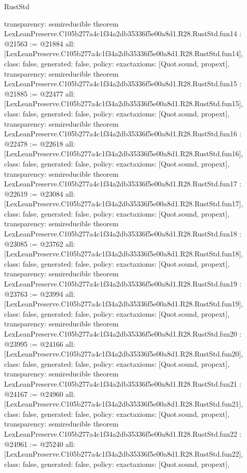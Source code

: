 \begin{lexlean}{RustStd}
\begin{coremodule}
{  transparency: semireducible
}
theorem LexLeanPreserve.C105b277a4c1f34a2db35336f5e00a8d1.R28.RustStd.fun14 : @21563 := @21884 {
  all: [LexLeanPreserve.C105b277a4c1f34a2db35336f5e00a8d1.R28.RustStd.fun14],
  class: false,
  generated: false,
  policy: exact{axioms: [Quot.sound, propext]},
  transparency: semireducible
}
theorem LexLeanPreserve.C105b277a4c1f34a2db35336f5e00a8d1.R28.RustStd.fun15 : @21885 := @22477 {
  all: [LexLeanPreserve.C105b277a4c1f34a2db35336f5e00a8d1.R28.RustStd.fun15],
  class: false,
  generated: false,
  policy: exact{axioms: [Quot.sound, propext]},
  transparency: semireducible
}
theorem LexLeanPreserve.C105b277a4c1f34a2db35336f5e00a8d1.R28.RustStd.fun16 : @22478 := @22618 {
  all: [LexLeanPreserve.C105b277a4c1f34a2db35336f5e00a8d1.R28.RustStd.fun16],
  class: false,
  generated: false,
  policy: exact{axioms: [Quot.sound, propext]},
  transparency: semireducible
}
theorem LexLeanPreserve.C105b277a4c1f34a2db35336f5e00a8d1.R28.RustStd.fun17 : @22619 := @23084 {
  all: [LexLeanPreserve.C105b277a4c1f34a2db35336f5e00a8d1.R28.RustStd.fun17],
  class: false,
  generated: false,
  policy: exact{axioms: [Quot.sound, propext]},
  transparency: semireducible
}
theorem LexLeanPreserve.C105b277a4c1f34a2db35336f5e00a8d1.R28.RustStd.fun18 : @23085 := @23762 {
  all: [LexLeanPreserve.C105b277a4c1f34a2db35336f5e00a8d1.R28.RustStd.fun18],
  class: false,
  generated: false,
  policy: exact{axioms: [Quot.sound, propext]},
  transparency: semireducible
}
theorem LexLeanPreserve.C105b277a4c1f34a2db35336f5e00a8d1.R28.RustStd.fun19 : @23763 := @23994 {
  all: [LexLeanPreserve.C105b277a4c1f34a2db35336f5e00a8d1.R28.RustStd.fun19],
  class: false,
  generated: false,
  policy: exact{axioms: [Quot.sound, propext]},
  transparency: semireducible
}
theorem LexLeanPreserve.C105b277a4c1f34a2db35336f5e00a8d1.R28.RustStd.fun20 : @23995 := @24166 {
  all: [LexLeanPreserve.C105b277a4c1f34a2db35336f5e00a8d1.R28.RustStd.fun20],
  class: false,
  generated: false,
  policy: exact{axioms: [Quot.sound, propext]},
  transparency: semireducible
}
theorem LexLeanPreserve.C105b277a4c1f34a2db35336f5e00a8d1.R28.RustStd.fun21 : @24167 := @24960 {
  all: [LexLeanPreserve.C105b277a4c1f34a2db35336f5e00a8d1.R28.RustStd.fun21],
  class: false,
  generated: false,
  policy: exact{axioms: [Quot.sound, propext]},
  transparency: semireducible
}
theorem LexLeanPreserve.C105b277a4c1f34a2db35336f5e00a8d1.R28.RustStd.fun22 : @24961 := @25240 {
  all: [LexLeanPreserve.C105b277a4c1f34a2db35336f5e00a8d1.R28.RustStd.fun22],
  class: false,
  generated: false,
  policy: exact{axioms: [Quot.sound, propext]},
}
\end{coremodule}
\end{lexlean}
